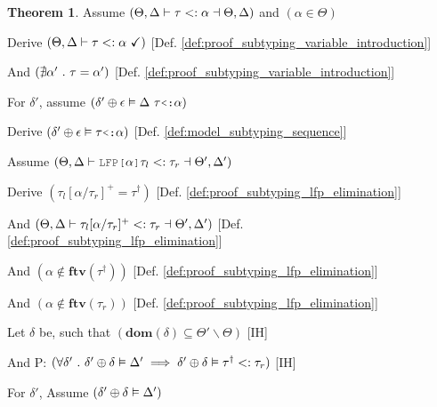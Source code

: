 \documentclass[acmsmall]{acmart}
\theoremstyle{definition}
\newtheorem{theorem}{Theorem}[section]
\begin{document}
\begin{theorem}

  \item \N Assume $(
    \Theta, \Delta \vdash 
    \tau <: \alpha \dashv \Theta, \Delta
  )$ and $(
    \alpha \in \Theta
  )$

  \item \I \N Derive $(
    \Theta, \Delta \vdash \tau <: \alpha \ \checkmark
  )$ [Def. \ref{def:proof_subtyping_variable_introduction}]

  \item \I \N And $(
    \nexists \alpha' \ .\  \tau = \alpha'
  )$ [Def. \ref{def:proof_subtyping_variable_introduction}]

  \item \I \N For $\delta'$, assume $(
    \delta' \oplus \epsilon \satisfies \Delta\ \tau \J{<:} \alpha
  )$ 
  \item \I\I \N Derive $(
    \delta' \oplus \epsilon \satisfies \tau \J{<:} \alpha
  )$ [Def. \ref{def:model_subtyping_sequence}]


  \item \N Assume $(
    \Theta, \Delta \entails 
    \J{LFP[}\alpha\J{]}\tau_l \subtypes \tau_r 
    \given \Theta', \Delta' 
  )$
  \item \I \N Derive $(
    \tau_l[\alpha\slash\tau_r]^+ = \tau^\dagger 
  )$ [Def. \ref{def:proof_subtyping_lfp_elimination}]
  \item \I \N And $(
    \Theta, \Delta \vdash 
    \tau_l[\alpha\slash\tau_r]^+ <: \tau_r \dashv 
    \Theta', \Delta'
  )$ [Def. \ref{def:proof_subtyping_lfp_elimination}]
  \item \I \N And $(
    \alpha \not\in \textbf{ftv}(\tau^\dagger)
  )$ [Def. \ref{def:proof_subtyping_lfp_elimination}]
  \item \I \N And $(
    \alpha \not\in \textbf{ftv}(\tau_r)
  )$ [Def. \ref{def:proof_subtyping_lfp_elimination}]

  \item \I \N Let $\delta$ be, such that $(
    \textbf{dom}(\delta) \subseteq \Theta' \backslash \Theta
  )$ [IH]

  \item \I \N And P: $(
    \forall \delta' \ .\ 
    \delta' \oplus \delta \vDash \Delta'
    \implies
    \delta' \oplus \delta \vDash \tau^\dagger <: \tau_r
  )$ [IH]


  \item \I \N For $\delta'$, Assume $(
    \delta' \oplus \delta \vDash \Delta'
  )$


\end{theorem}
\end{document}
